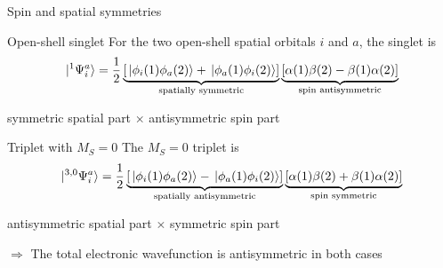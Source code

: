 \documentclass[aspectratio=169,9pt]{beamer}
\newcommand{\red}[1]{\textcolor{hfRed}{#1}}
\newcommand{\green}[1]{\textcolor{hfGreen}{#1}}
\begin{document}
\begin{frame}{Spin and spatial symmetries}
	\begin{block}{Open-shell singlet}
    	For the two open-shell spatial orbitals $i$ and $a$, the singlet is
    	\begin{equation*}
    		\ket*{{}^1\Psi_{i}^{a}}
    		=
    		\frac{1}{2}
    		\underbrace{
    			\left[
    				\ket*{\phi_i(1)\phi_a(2)}+\ket*{\phi_a(1)\phi_i(2)}
    			\right]
    		}_{\text{spatially symmetric}}
    		\underbrace{
    			\left[
    				\alpha(1)\beta(2)-\beta(1)\alpha(2)
    			\right]
    		}_{\text{spin antisymmetric}}
    	\end{equation*}

		\centering
		\green{symmetric spatial part}
		$\times$
		\red{antisymmetric spin part}
	\end{block}

	\begin{block}{Triplet with $M_S=0$}
    	The $M_S=0$ triplet is
    	\begin{equation*}
    		\ket*{{}^{3,0}\Psi_{i}^{a}}
    		=
    		\frac{1}{2}
    		\underbrace{
    			\left[
    				\ket*{\phi_i(1)\phi_a(2)}-\ket*{\phi_a(1)\phi_i(2)}
    			\right]
    		}_{\text{spatially antisymmetric}}
    		\underbrace{
    			\left[
    				\alpha(1)\beta(2)+\beta(1)\alpha(2)
    			\right]
    		}_{\text{spin symmetric}}
    	\end{equation*}

		\centering
		\red{antisymmetric spatial part}
		$\times$
		\green{symmetric spin part}
	\end{block}

	\vfill
	\center
	$\Rightarrow$ \alert{The total electronic wavefunction is antisymmetric in both cases}
\end{frame}
\end{document}
